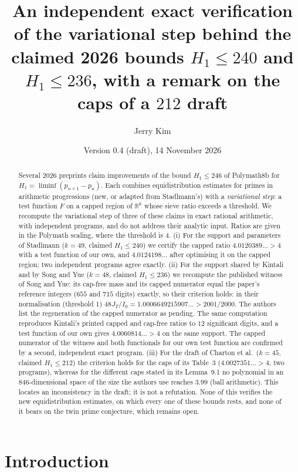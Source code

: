 \documentclass[11pt]{amsart}
\title[Verifying the variational step of the 2026 gap bounds]{An independent exact verification of the variational step behind the claimed 2026 bounds $H_1\le240$ and $H_1\le236$, with a remark on the caps of a $212$ draft}
\author{Jerry Kim}
\date{Version 0.4 (draft), 14 November 2026}
\theoremstyle{definition}
\theoremstyle{remark}
\begin{document}
\begin{abstract}
Several 2026 preprints claim improvements of the bound $H_1\le246$ of
Polymath8b for $H_1=\liminf(p_{n+1}-p_n)$. Each combines equidistribution
estimates for primes in arithmetic progressions (new, or adapted from
Stadlmann's) with a \emph{variational step}:
a test function $F$ on a capped region of $\mathbb R^k$ whose sieve ratio
exceeds a threshold. We recompute the variational step of three of these
claims in exact rational arithmetic, with independent programs, and do not
address their analytic input. Ratios are given in the Polymath scaling, where
the threshold is $4$. (i) For the support and parameters of Stadlmann
($k=49$, claimed $H_1\le240$) we certify the capped ratio $4.0120389\ldots>4$
with a test function of our own, and $4.0124198\ldots$ after optimising it on
the capped region; two independent programs agree exactly.
(ii) For the support shared by Kintali and by Song and Yue ($k=48$, claimed
$H_1\le236$) we recompute the published witness of Song and Yue: its cap-free
mass and its capped numerator equal the paper's reference integers ($655$ and
$715$ digits) exactly, so their criterion holds: in their normalisation (threshold
$1$) $48J_T/I_0=1.0006649215907\ldots>2001/2000$. The authors list the regeneration of the
capped numerator as pending. The same computation reproduces Kintali's
printed capped and cap-free ratios to $12$ significant digits, and a test
function of our own gives $4.0060814\ldots>4$ on the same support. The capped
numerator of the witness and both functionals for our own test function are
confirmed by a second, independent exact program.
(iii) For the draft of Charton et al.\ ($k=45$, claimed $H_1\le212$) the
criterion holds for the caps of its Table~3 ($4.0027351\ldots>4$, two
programs), whereas for the different caps stated in its Lemma~9.1 no
polynomial in an $846$-dimensional space of the size the authors use reaches
$3.99$ (ball arithmetic). This locates an inconsistency in the draft; it is
not a refutation. None of this verifies the new equidistribution estimates,
on which every one of these bounds rests, and none of it bears on the twin
prime conjecture, which remains open.
\end{abstract}

\maketitle

\section{Introduction}
\end{document}

